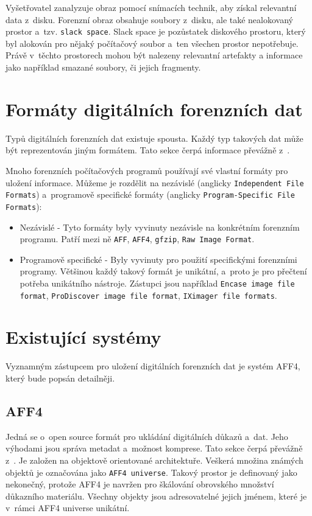 Vyšetřovatel zanalyzuje obraz pomocí snímacích technik, aby získal relevantní data z~disku. Forenzní obraz obsahuje soubory z~disku, ale také nealokovaný prostor a~tzv. \texttt{slack space}. Slack space je pozůstatek diskového prostoru, který byl alokován pro nějaký počítačový soubor a~ten všechen prostor nepotřebuje. Právě v~těchto prostorech mohou být nalezeny relevantní artefakty a informace jako například smazané soubory, či jejich fragmenty. \cite{forensicImages}

\section{Formáty digitálních forenzních dat}
Typů digitálních forenzních dat existuje spousta. Každý typ takových dat může být reprezentován jiným formátem. Tato sekce čerpá informace převážně z~\cite{forensicswikiForensicFF}.

Mnoho forenzních počítačových programů používají své vlastní formáty pro uložení informace. Můžeme je rozdělit na nezávislé (anglicky \texttt{Independent File Formats}) a~programově specifické formáty (anglicky \texttt{Program-Specific File Formats}):

\begin{itemize}
\item Nezávislé - Tyto formáty byly vyvinuty nezávisle na konkrétním forenzním programu. Patří mezi ně \texttt{AFF}, \texttt{AFF4}, \texttt{gfzip}, \texttt{Raw Image Format}.

\item Programově specifické - Byly vyvinuty pro použití specifickými forenzními programy. Většinou každý takový formát je unikátní, a~proto je pro přečtení potřeba unikátního nástroje.
Zástupci jsou například \texttt{Encase image file format}, \texttt{ProDiscover image file format}, \texttt{IXimager file formats}.
\end{itemize}

\section{Existující systémy}
Vyznamným zástupcem pro uložení digitálních forenzních dat je systém AFF4, který bude popsán detailněji.

\subsection{AFF4}
Jedná se o~open source formát pro ukládání digitálních důkazů a~dat. Jeho výhodami jsou správa metadat a~možnost komprese. Tato sekce čerpá převážně z~\cite{aff4}. Je založen na objektově orientované architektuře. Veškerá množina známých objektů je označována jako \texttt{AFF4 universe}. Takový prostor je definovaný jako nekonečný, protože AFF4 je navržen pro škálování obrovského množství důkazního materiálu. Všechny objekty jsou adresovatelné jejich jménem, které je v~rámci AFF4 universe unikátní.

